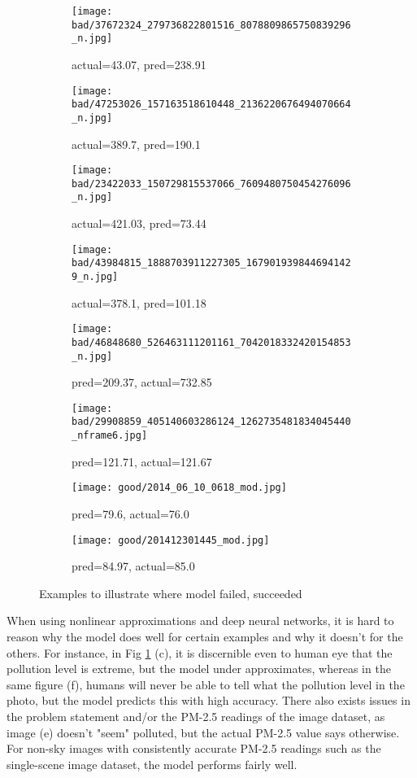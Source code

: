 \documentclass{article}
\begin{document}
\begin{figure}[H]
\centering
\begin{subfigure}{.5\textwidth}
  \centering
  \texttt{[image: bad/37672324\_279736822801516\_8078809865750839296\_n.jpg]}
  \caption{actual=43.07, pred=238.91}
\end{subfigure}%
\begin{subfigure}{.5\textwidth}
  \centering
  \texttt{[image: bad/47253026\_157163518610448\_2136220676494070664\_n.jpg]}
  \caption{actual=389.7, pred=190.1}
\end{subfigure}

\begin{subfigure}{.5\textwidth}
  \centering
  \texttt{[image: bad/23422033\_150729815537066\_7609480750454276096\_n.jpg]}
  \caption{actual=421.03, pred=73.44}
\end{subfigure}%
\begin{subfigure}{.5\textwidth}
  \centering
  \texttt{[image: bad/43984815\_1888703911227305\_1679019398446941429\_n.jpg]}
  \caption{actual=378.1, pred=101.18}
\end{subfigure}

\begin{subfigure}{.5\textwidth}
  \centering
  \texttt{[image: bad/46848680\_526463111201161\_7042018332420154853\_n.jpg]}
  \caption{pred=209.37, actual=732.85}
\end{subfigure}%
\begin{subfigure}{.5\textwidth}
  \centering
  \texttt{[image: bad/29908859\_405140603286124\_1262735481834045440\_nframe6.jpg]}
  \caption{pred=121.71, actual=121.67}
\end{subfigure}

\begin{subfigure}{.5\textwidth}
  \centering
  \texttt{[image: good/2014\_06\_10\_0618\_mod.jpg]}
  \caption{pred=79.6, actual=76.0}
\end{subfigure}%
\begin{subfigure}{.5\textwidth}
  \centering
  \texttt{[image: good/201412301445\_mod.jpg]}
  \caption{pred=84.97, actual=85.0}
\end{subfigure}
\caption{Examples to illustrate where model failed, succeeded}
\label{Examples to illustrate where model failed, succeeded}
\end{figure}
When using nonlinear approximations and deep neural networks, it is hard to reason why the model does well for certain examples and why it doesn't for the others. For instance, in Fig \ref{Examples to illustrate where model failed, succeeded} (c), it is discernible even to human eye that the pollution level is extreme, but the model under approximates, whereas in the same figure (f), humans will never be able to tell what the pollution level in the photo, but the model predicts this with high accuracy. There also exists issues in the problem statement and/or the PM-2.5 readings of the image dataset, as image (e) doesn't "seem" polluted, but the actual PM-2.5 value says otherwise. For non-sky images with consistently accurate PM-2.5 readings such as the single-scene image dataset, the model performs fairly well.
\end{document}
